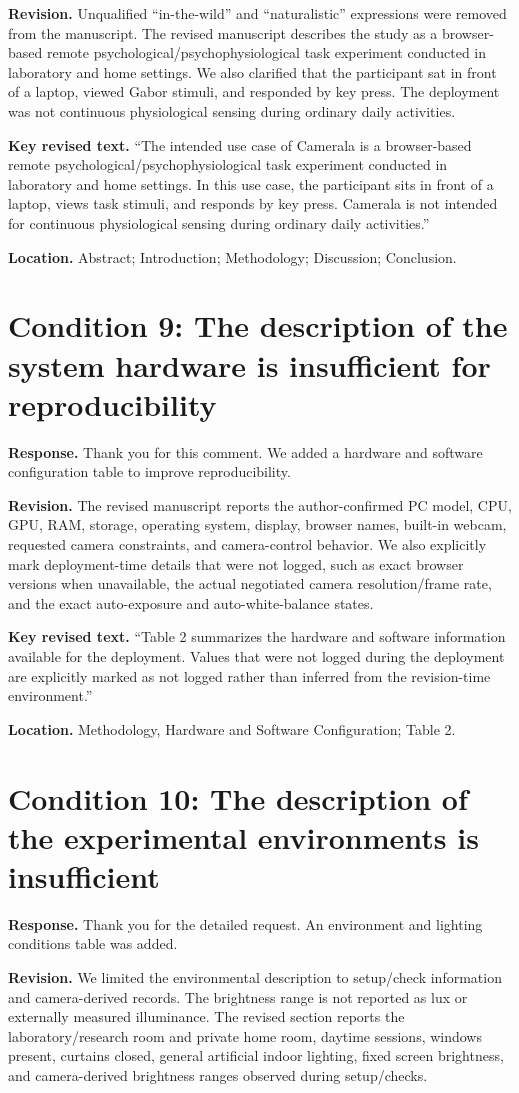 \documentclass[11pt]{article}
\newcommand{\condition}[2]{\section*{Condition #1: #2}}
\begin{document}
\textbf{Revision.}
Unqualified ``in-the-wild'' and ``naturalistic'' expressions were removed from the manuscript.
The revised manuscript describes the study as a browser-based remote psychological/psychophysiological task experiment conducted in laboratory and home settings.
We also clarified that the participant sat in front of a laptop, viewed Gabor stimuli, and responded by key press.
The deployment was not continuous physiological sensing during ordinary daily activities.

\textbf{Key revised text.}
``The intended use case of Camerala is a browser-based remote psychological/psychophysiological task experiment conducted in laboratory and home settings. In this use case, the participant sits in front of a laptop, views task stimuli, and responds by key press. Camerala is not intended for continuous physiological sensing during ordinary daily activities.''

\textbf{Location.}
Abstract; Introduction; Methodology; Discussion; Conclusion.

\condition{9}{The description of the system hardware is insufficient for reproducibility}
\textbf{Response.}
Thank you for this comment.
We added a hardware and software configuration table to improve reproducibility.

\textbf{Revision.}
The revised manuscript reports the author-confirmed PC model, CPU, GPU, RAM, storage, operating system, display, browser names, built-in webcam, requested camera constraints, and camera-control behavior.
We also explicitly mark deployment-time details that were not logged, such as exact browser versions when unavailable, the actual negotiated camera resolution/frame rate, and the exact auto-exposure and auto-white-balance states.

\textbf{Key revised text.}
``Table 2 summarizes the hardware and software information available for the deployment.
Values that were not logged during the deployment are explicitly marked as not logged rather than inferred from the revision-time environment.''

\textbf{Location.}
Methodology, Hardware and Software Configuration; Table 2.

\condition{10}{The description of the experimental environments is insufficient}
\textbf{Response.}
Thank you for the detailed request.
An environment and lighting conditions table was added.

\textbf{Revision.}
We limited the environmental description to setup/check information and camera-derived records.
The brightness range is not reported as lux or externally measured illuminance.
The revised section reports the laboratory/research room and private home room, daytime sessions, windows present, curtains closed, general artificial indoor lighting, fixed screen brightness, and camera-derived brightness ranges observed during setup/checks.
\end{document}
